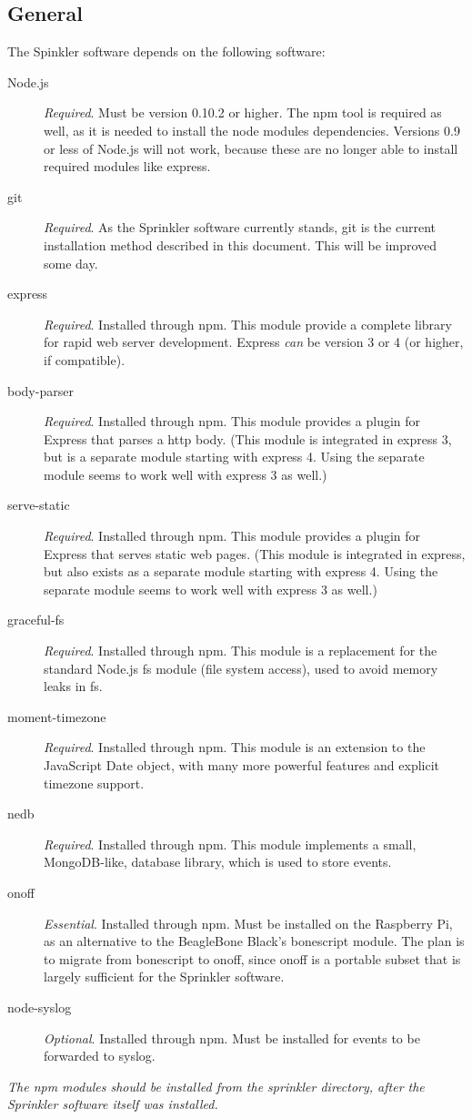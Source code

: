 \documentclass[11pt]{book}
\begin{document}
\subsection{General}
The Spinkler software depends on the following software:
\begin{description}
\item[Node.js] \emph{Required}. Must be version 0.10.2 or higher. The npm tool is required as well, as it is needed to install the node modules dependencies. Versions 0.9 or less of Node.js will not work, because these are no longer able to install required modules like express.
\item[git] \emph{Required}. As the Sprinkler software currently stands, git is the current installation method described in this document. This will be improved some day.
\item[express] \emph{Required}. Installed through npm. This module provide a complete library for rapid web server development. Express \emph{can} be version 3 or 4 (or higher, if compatible).
\item[body-parser] \emph{Required}. Installed through npm. This module provides a plugin for Express that parses a http body. (This module is integrated in express 3, but is a separate module starting with express 4. Using the separate module seems to work well with express 3 as well.)
\item[serve-static] \emph{Required}. Installed through npm. This module provides a plugin for Express that serves static web pages. (This module is integrated in express, but also exists as a separate module starting with express 4. Using the separate module seems to work well with express 3 as well.)
\item[graceful-fs] \emph{Required}. Installed through npm. This module is a replacement for the standard Node.js fs module (file system access), used to avoid memory leaks in fs.
\item[moment-timezone] \emph{Required}. Installed through npm. This module is an extension to the JavaScript Date object, with many more powerful features and explicit timezone support.
\item[nedb] \emph{Required}. Installed through npm. This module implements a small, MongoDB-like, database library, which is used to store events.
\item[onoff] \emph{Essential}. Installed through npm. Must be installed on the Raspberry Pi, as an alternative to the BeagleBone Black's bonescript module. The plan is to migrate from bonescript to onoff, since onoff is a portable subset that is largely sufficient for the Sprinkler software.
\item[node-syslog] \emph{Optional}. Installed through npm. Must be installed for events to be forwarded to syslog. 
\end{description}
\emph{The npm modules should be installed from the sprinkler directory, after the Sprinkler software itself was installed.}
\end{document}
